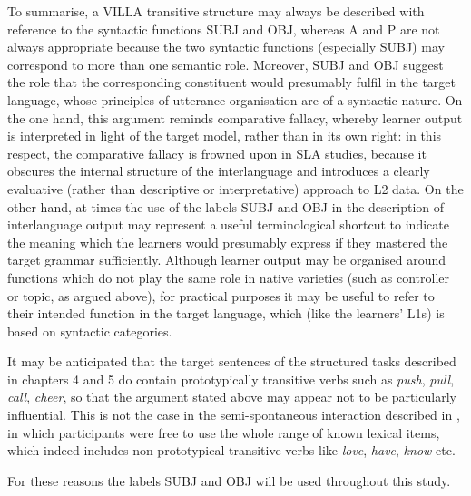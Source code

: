 To summarise, a VILLA transitive structure may always be described with reference to the syntactic functions SUBJ and OBJ, whereas A and P are not always appropriate because the two syntactic functions (especially SUBJ) may correspond to more than one semantic role. Moreover, SUBJ and OBJ suggest the role that the corresponding constituent would presumably fulfil in the target language, whose principles of utterance organisation are of a syntactic nature. On the one hand, this argument reminds  comparative fallacy, whereby learner output is interpreted in light of the target model, rather than in its own right: in this respect, the comparative fallacy is frowned upon in SLA studies, because it obscures the internal structure of the interlanguage and introduces a clearly evaluative (rather than descriptive or interpretative) approach to L2 data. On the other hand, at times the use of the labels SUBJ and OBJ in the description of interlanguage output may represent a useful terminological shortcut to indicate the meaning which the learners would presumably express if they mastered the target grammar sufficiently. Although learner output may be organised around functions which do not play the same role in native varieties (such as controller or topic, as argued above), for practical purposes it may be useful to refer to their intended function in the target language, which (like the learners’ L1s) is based on syntactic categories.

It may be anticipated that the target sentences of the structured tasks described in chapters 4 and 5 do contain prototypically transitive verbs such as \textit{push}, \textit{pull}, \textit{call}, \textit{cheer}, so that the argument stated above may appear not to be particularly influential. This is not the case in the semi-spontaneous interaction described in , in which participants were free to use the whole range of known lexical items, which indeed includes non-prototypical transitive verbs like \textit{love}, \textit{have}, \textit{know} etc.

For these reasons the labels SUBJ and OBJ will be used throughout this study. 

